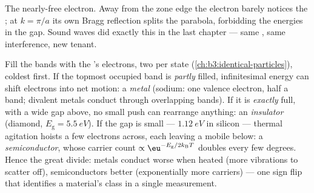 \begin{omfigure}

{\small The nearly-free electron. Away from the zone edge the
electron barely notices the ; at $k = \pi/a$ its own Bragg
reflection splits the parabola, forbidding the energies in the
gap. Sound waves did exactly this in the last chapter --- same
, same interference, new tenant.}
\end{omfigure}

\begin{definition}\label{def:b3:electrons-in-solids:classes}
Fill the bands with the 's electrons, two per state
(\cref{ch:b3:identical-particles}), coldest first. If the topmost
occupied band is \emph{partly} filled, infinitesimal energy can
shift electrons into net motion: a \emph{metal} (sodium: one
valence electron, half a band; divalent metals conduct through
overlapping bands). If it is \emph{exactly} full, with a wide gap
above, no small push can rearrange anything: an \emph{insulator}
(diamond, $E_{\text{g}} = \qty{5.5}{eV}$). If the gap is small ---
$\qty{1.12}{eV}$ in silicon --- thermal agitation hoists a few
electrons across, each leaving a mobile \emph{} below: a
\emph{semiconductor}, whose carrier count
$\propto\eu^{-E_{\text{g}}/2k_{\text{B}}T}$ doubles every few
degrees. Hence the great divide: metals conduct worse when heated
(more vibrations to scatter off), semiconductors better
(exponentially more carriers) --- one sign flip that identifies a
material's class in a single measurement.
\end{definition}

